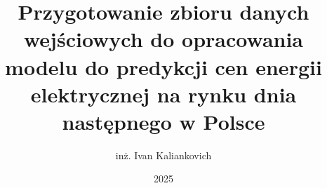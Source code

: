 \documentclass[thesis=mgr,faculty=gik]{EE-dyplom}
\title{Przygotowanie zbioru danych wejściowych do opracowania modelu do predykcji cen energii elektrycznej na rynku dnia następnego w Polsce}
\author{inż. Ivan Kaliankovich}
\date{2025}
\begin{document}
    \frontpages %

    
    \makeatletter
    \@openrightfalse
    \makeatother
    
    
    
    
    
    

    \bibliografia
    
    \acronymslist

    \listoffigures
    \listoftables
    \easyappendices
\end{document}
